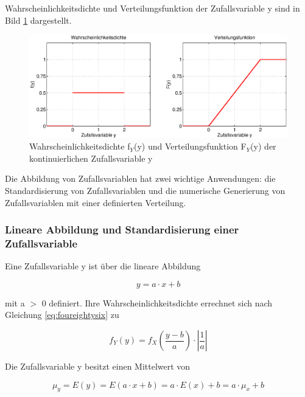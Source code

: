 \noindent Wahrscheinlichkeitsdichte und Verteilungsfunktion der Zufallsvariable y sind in Bild \ref{fig:FunktionVonZufallsvariablen2} dargestellt.

\noindent 
\begin{figure}[H]
  \centerline{\includegraphics[width=1\textwidth]{Kapitel4/Bilder/image7}}
  \caption{Wahrscheinlichkeitsdichte f$_{Y}$(y) und Verteilungsfunktion F$_{Y}$(y) der kontinuierlichen Zufallsvariable y}
  \label{fig:FunktionVonZufallsvariablen2}
\end{figure}

\noindent Die Abbildung von Zufallsvariablen hat zwei wichtige Anwendungen: die Standardisierung von Zufallsvariablen und die numerische Generierung von Zufallsvariablen mit einer definierten Verteilung.


\subsubsection{Lineare Abbildung und Standardisierung einer Zufallsvariable}\label{fourthree}

\noindent Eine Zufallsvariable y ist über die lineare Abbildung 

\begin{equation}\label{eq:fourninetythree}
y=a\cdot x+b
\end{equation}

\noindent mit a $\mathrm{>}$ 0 definiert. Ihre Wahrscheinlichkeitsdichte errechnet sich nach Gleichung \eqref{eq:foureightysix} zu

\begin{equation}\label{eq:fourninetyfour}
f_{Y} (y)=f_{X} \left(\dfrac{y-b}{a} \right)\cdot \left|\dfrac{1}{a} \right|
\end{equation}

\noindent Die Zufallsvariable y besitzt einen Mittelwert von

\begin{equation}\label{eq:fourninetyfive}
\mu _{y} =E(y)=E\left(a\cdot x+b\right)=a\cdot E(x)+b=a\cdot \mu _{x} +b
\end{equation}


